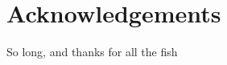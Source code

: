 \documentclass[%
    corpo=11pt,
    twoside, %
    oldstyle,
    autoretitolo,
    greek,
    evenboxes,
]{toptesi}
\begin{document}


%



\backmatter



\printbibliography[heading=bibintoc]

\chapter*{Acknowledgements}
\thispagestyle{empty}

So long, and thanks for all the fish





\end{document}
